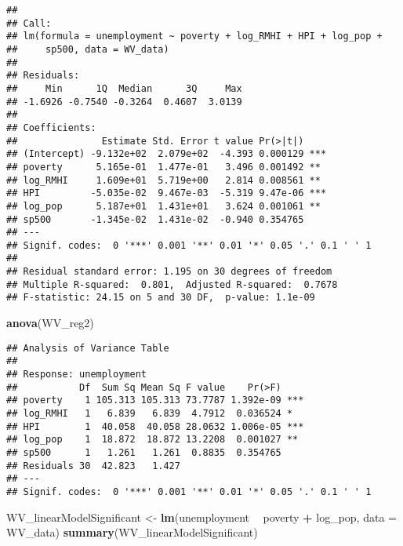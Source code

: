 \documentclass[
]{article}
\newenvironment{Shaded}{\begin{snugshade}}{\end{snugshade}}
\newcommand{\DataTypeTok}[1]{\textcolor[rgb]{0.13,0.29,0.53}{#1}}
\newcommand{\KeywordTok}[1]{\textcolor[rgb]{0.13,0.29,0.53}{\textbf{#1}}}
\newcommand{\NormalTok}[1]{#1}
\newcommand{\OperatorTok}[1]{\textcolor[rgb]{0.81,0.36,0.00}{\textbf{#1}}}
\newcommand{\StringTok}[1]{\textcolor[rgb]{0.31,0.60,0.02}{#1}}
\begin{document}
\begin{verbatim}
## 
## Call:
## lm(formula = unemployment ~ poverty + log_RMHI + HPI + log_pop + 
##     sp500, data = WV_data)
## 
## Residuals:
##     Min      1Q  Median      3Q     Max 
## -1.6926 -0.7540 -0.3264  0.4607  3.0139 
## 
## Coefficients:
##               Estimate Std. Error t value Pr(>|t|)    
## (Intercept) -9.132e+02  2.079e+02  -4.393 0.000129 ***
## poverty      5.165e-01  1.477e-01   3.496 0.001492 ** 
## log_RMHI     1.609e+01  5.719e+00   2.814 0.008561 ** 
## HPI         -5.035e-02  9.467e-03  -5.319 9.47e-06 ***
## log_pop      5.187e+01  1.431e+01   3.624 0.001061 ** 
## sp500       -1.345e-02  1.431e-02  -0.940 0.354765    
## ---
## Signif. codes:  0 '***' 0.001 '**' 0.01 '*' 0.05 '.' 0.1 ' ' 1
## 
## Residual standard error: 1.195 on 30 degrees of freedom
## Multiple R-squared:  0.801,  Adjusted R-squared:  0.7678 
## F-statistic: 24.15 on 5 and 30 DF,  p-value: 1.1e-09
\end{verbatim}

\begin{Shaded}
\begin{Highlighting}[]
\KeywordTok{anova}\NormalTok{(WV_reg2)}
\end{Highlighting}
\end{Shaded}

\begin{verbatim}
## Analysis of Variance Table
## 
## Response: unemployment
##           Df  Sum Sq Mean Sq F value    Pr(>F)    
## poverty    1 105.313 105.313 73.7787 1.392e-09 ***
## log_RMHI   1   6.839   6.839  4.7912  0.036524 *  
## HPI        1  40.058  40.058 28.0632 1.006e-05 ***
## log_pop    1  18.872  18.872 13.2208  0.001027 ** 
## sp500      1   1.261   1.261  0.8835  0.354765    
## Residuals 30  42.823   1.427                      
## ---
## Signif. codes:  0 '***' 0.001 '**' 0.01 '*' 0.05 '.' 0.1 ' ' 1
\end{verbatim}

\begin{Shaded}
\begin{Highlighting}[]
\NormalTok{WV_linearModelSignificant <-}\StringTok{ }\KeywordTok{lm}\NormalTok{(unemployment }\OperatorTok{~}\StringTok{ }\NormalTok{poverty }\OperatorTok{+}\StringTok{ }\NormalTok{log_pop, }\DataTypeTok{data =}\NormalTok{ WV_data)}
\KeywordTok{summary}\NormalTok{(WV_linearModelSignificant)}
\end{Highlighting}
\end{Shaded}
\end{document}
